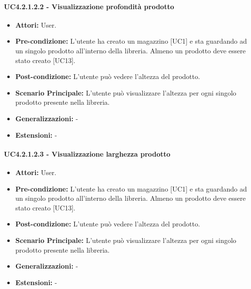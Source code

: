 \paragraph{UC4.2.1.2.2 - Visualizzazione profondità prodotto}
\begin{itemize} 
    \item \textbf{Attori:} User.
    \item \textbf{Pre-condizione:} L'utente ha creato un magazzino [UC1] e sta guardando ad un singolo prodotto all'interno della libreria. Almeno un prodotto deve essere stato creato [UC13].
    \item \textbf{Post-condizione:}  L'utente può vedere l'altezza del prodotto.
    \item \textbf{Scenario Principale:} L'utente può visualizzare l'altezza per ogni singolo prodotto presente nella libreria. 
    \item \textbf{Generalizzazioni:} -
    \item \textbf{Estensioni:} -
\end{itemize}


\paragraph{UC4.2.1.2.3 - Visualizzazione larghezza prodotto}
\begin{itemize} 
    \item \textbf{Attori:} User.
    \item \textbf{Pre-condizione:} L'utente ha creato un magazzino [UC1] e sta guardando ad un singolo prodotto all'interno della libreria. Almeno un prodotto deve essere stato creato [UC13].
    \item \textbf{Post-condizione:}  L'utente può vedere l'altezza del prodotto.
    \item \textbf{Scenario Principale:} L'utente può visualizzare l'altezza per ogni singolo prodotto presente nella libreria. 
    \item \textbf{Generalizzazioni:} -
    \item \textbf{Estensioni:} -
\end{itemize}


